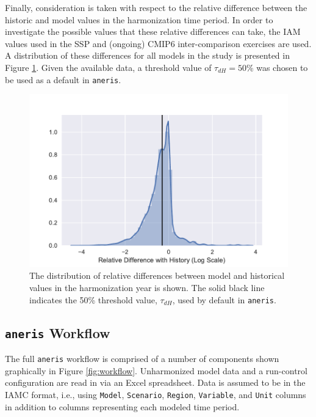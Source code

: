 \documentclass[review]{elsarticle}
\newcommand{\code}[1]{\lstinline[basicstyle=\ttfamily\color{black}]|#1|}
\begin{document}
Finally, consideration is taken with respect to the relative difference between
the historic and model values in the harmonization time period. In order to
investigate the possible values that these relative differences can take, the
IAM values used in the SSP and (ongoing) CMIP6 inter-comparison
exercises are used. A distribution of these differences for all models in the
study is presented in Figure \ref{fig:dh}. Given the available data, a threshold
value of $\tau_{dH} = 50$\% was chosen to be used as a default in \code{aneris}.

\begin{figure}
  \begin{center}
    \includegraphics[width=\textwidth]{dh.pdf}
    \caption[]{
      \label{fig:dh}
      The distribution of relative differences between model and historical
      values in the harmonization year is shown. The solid black line indicates
      the 50\% threshold value, $\tau_{dH}$, used by default in \code{aneris}.
    }
  \end{center}
\end{figure}

\subsection{\code{aneris} Workflow}\label{sec:workflow}

The full \code{aneris} workflow is comprised of a number of components shown
graphically in Figure \ref{fig:workflow}. Unharmonized model data and a
run-control configuration are read in via an Excel spreadsheet. Data is assumed
to be in the IAMC format, i.e., using \code{Model}, \code{Scenario},
\code{Region}, \code{Variable}, and \code{Unit} columns in addition to columns
representing each modeled time period.
\end{document}
